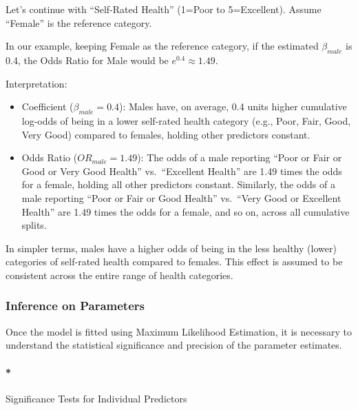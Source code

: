 \documentclass[
  letterpaper,
  DIV=11,
  numbers=noendperiod]{scrartcl}
\let\oldparagraph\paragraph
\renewcommand{\paragraph}[1]{\oldparagraph{#1}\mbox{}}
\begin{document}
Let's continue with ``Self-Rated Health'' (1=Poor to 5=Excellent).
Assume ``Female'' is the reference category.

In our example, keeping Female as the reference category, if the
estimated \(\beta_{male}\) is 0.4, the Odds Ratio for Male would be
\(e^{0.4}\approx 1.49\).

Interpretation:

\begin{itemize}
\item
  Coefficient (\(\beta_{male}=0.4\)): Males have, on average, 0.4 units
  higher cumulative log-odds of being in a lower self-rated health
  category (e.g., Poor, Fair, Good, Very Good) compared to females,
  holding other predictors constant.
\item
  Odds Ratio (\(OR_{male}=1.49\)): The odds of a male reporting ``Poor
  or Fair or Good or Very Good Health'' vs.~``Excellent Health'' are
  1.49 times the odds for a female, holding all other predictors
  constant. Similarly, the odds of a male reporting ``Poor or Fair or
  Good Health'' vs.~``Very Good or Excellent Health'' are 1.49 times the
  odds for a female, and so on, across all cumulative splits.
\end{itemize}

In simpler terms, males have a higher odds of being in the less healthy
(lower) categories of self-rated health compared to females. This effect
is assumed to be consistent across the entire range of health
categories.

\hypertarget{inference-on-parameters}{%
\subsubsection*{Inference on Parameters}\label{inference-on-parameters}}

Once the model is fitted using Maximum Likelihood Estimation, it is
necessary to understand the statistical significance and precision of
the parameter estimates.

\hypertarget{significance-tests-for-individual-predictors}{%
\paragraph*{Significance Tests for Individual
Predictors}\label{significance-tests-for-individual-predictors}}
\end{document}
